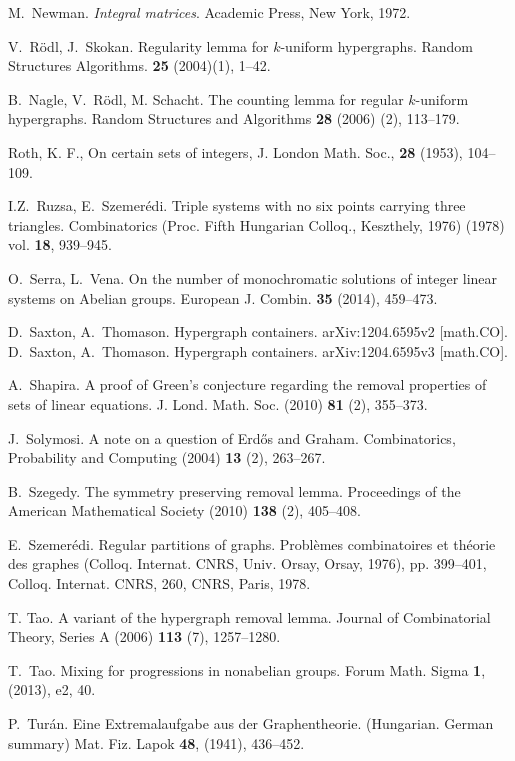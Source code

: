 \documentclass[10pt]{article}
\begin{document}
\begin{thebibliography}{99}
M.~Newman. \emph{Integral matrices}. Academic Press, New York, 1972.

V.~R{{\"o}}dl, J.~Skokan. Regularity lemma for {$k$}-uniform hypergraphs. Random Structures Algorithms.  \textbf{25} (2004)(1), 1--42.

 B.~Nagle, V.~R\"odl, M. Schacht. The counting lemma for regular $k$-uniform hypergraphs. Random Structures and Algorithms \textbf{28} (2006) (2), 113--179.

Roth, K. F., On certain sets of integers,
J. London Math. Soc.,
\textbf{28} (1953), 104--109.

 I.Z.~Ruzsa, E.~Szemer\'edi. Triple systems with no six points carrying three triangles. Combinatorics (Proc. Fifth Hungarian Colloq., Keszthely, 1976) (1978) vol. \textbf{18}, 939--945.

 O.~Serra, L.~Vena. On the number of monochromatic solutions of integer linear systems on  Abelian groups. European J. Combin. \textbf{35} (2014), 459--473.

 D.~Saxton, A.~Thomason. Hypergraph containers.  arXiv:1204.6595v2 [math.CO].
 D.~Saxton, A.~Thomason. Hypergraph containers.  arXiv:1204.6595v3 [math.CO].

 A.~Shapira. A proof of {G}reen's conjecture regarding the removal properties of sets of linear equations. J. Lond. Math. Soc. (2010)  \textbf{81} (2), 355--373.

 J.~Solymosi. A note on a question of Erd\H{o}s and Graham. Combinatorics, Probability and Computing (2004) \textbf{13} (2), 263--267.

B.~Szegedy. The symmetry preserving removal lemma. Proceedings of the American Mathematical Society (2010) \textbf{138} (2), 405--408.

E.~Szemer\'edi. Regular partitions of graphs. Probl\`emes combinatoires et théorie des graphes (Colloq. Internat. CNRS, Univ. Orsay, Orsay, 1976), pp. 399--401, Colloq. Internat. CNRS, 260, CNRS, Paris, 1978.

 T. Tao. A variant of the hypergraph removal lemma. Journal of Combinatorial Theory, Series A (2006) \textbf{113} (7), 1257--1280.


 T.~Tao.
Mixing for progressions in nonabelian groups.
Forum Math. Sigma \textbf{1}, (2013), e2, 40.

P.~Tur\'an.
Eine Extremalaufgabe aus der Graphentheorie. (Hungarian. German summary) 
Mat. Fiz. Lapok \textbf{48}, (1941), 436--452.



\end{thebibliography}
\end{document}
